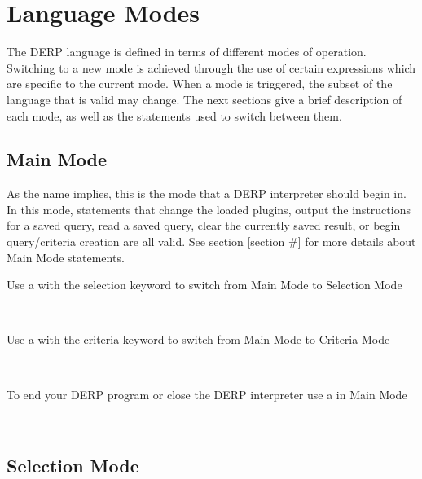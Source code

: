 \section{Language Modes}

The DERP language is defined in terms of different modes of operation. 
Switching to a new mode is achieved through the use of certain expressions 
which are specific to the current mode. When a mode is triggered, the 
subset of the language that is valid may change. The next sections give 
a brief description of each mode, as well as the statements used to switch between them.


\subsection{Main Mode}

As the name implies, this is the mode that a DERP interpreter should begin in. In this mode, 
statements that change the loaded plugins, output the instructions for a saved query, read a 
saved query, clear the currently saved result, or begin query/criteria creation are all valid. 
See section [section #] for more details about Main Mode statements.

Use a  with the selection keyword to switch from Main Mode to Selection Mode\\
\begin{center}
     \\
\end{center}

Use a  with the criteria keyword to switch from Main Mode to Criteria Mode\\
\begin{center}
     \\
\end{center}

To end your DERP program or close the DERP interpreter use a  in Main Mode\\
\begin{center}
     \\
\end{center}


\subsection{Selection Mode}


